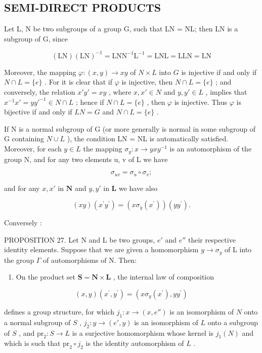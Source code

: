 \subsection{SEMI-DIRECT PRODUCTS}

Let L, N be two subgroups of a group G, such that LN = NL; then LN is a subgroup of G, since

\[
(\mathrm{LN}) (\mathrm{LN}) ^ {- 1} = \mathrm{LNN} ^ {- 1} \mathrm{L} ^ {- 1} = \mathrm{LNL} = \mathrm{LLN} = \mathrm{LN}
\]

Moreover, the mapping \(\varphi: (x, y) \to xy\) of \(N \times L\) into \(G\) is injective if and only if \(N \cap L = \{e\}\) . For it is clear that if \(\varphi\) is injective, then \(N \cap L = \{e\}\) ; and conversely, the relation \(x' y' = xy\) , where \(x, x' \in N\) and \(y, y' \in L\) , implies that \(x^{-1}x' = yy'^{-1} \in N \cap L\) ; hence if \(N \cap L = \{e\}\) , then \(\varphi\) is injective. Thus \(\varphi\) is bijective if and only if \(LN = G\) and \(N \cap L = \{e\}\) .

If N is a normal subgroup of G (or more generally is normal in some subgroup of G containing \(N \cup L\) ), the condition LN = NL is automatically satisfied. Moreover, for each \(y \in L\) the mapping \(\sigma_{y}: x \to yxy^{-1}\) is an automorphism of the group N, and for any two elements u, v of L we have

\[
\sigma_ {u v} = \sigma_ {u} \circ \sigma_ {v};\tag{1}
\]

and for any \(x, x'\) in \(\mathbf{N}\) and \(y, y'\) in \(\mathbf{L}\) we have also

\[
(x y) (x ^ {\prime} y ^ {\prime}) = (x \sigma_ {y} (x ^ {\prime})) (y y ^ {\prime}).\tag{2}
\]

Conversely :

PROPOSITION 27. Let N and L be two groups, \(e'\) and \(e''\) their respective identity elements. Suppose that we are given a homomorphism \(y \to \sigma_y\) of L into the group \(\Gamma\) of automorphisms of N. Then:

\begin{enumerate}
\def\labelenumi{\arabic{enumi})}
\tightlist
\item
  On the product set \(\mathbf{S} = \mathbf{N} \times \mathbf{L}\) , the internal law of composition
\end{enumerate}

\[
(x, y) (x ^ {\prime}, y ^ {\prime}) = (x \sigma_ {y} (x ^ {\prime}), y y ^ {\prime})\tag{3}
\]

defines a group structure, for which \(j_1: x \to (x, e'')\) is an isomorphism of \(N\) onto a normal subgroup of \(S\) , \(j_2: y \to (e', y)\) is an isomorphism of \(L\) onto a subgroup of \(S\) , and \(\mathrm{pr}_2: S \to L\) is a surjective homomorphism whose kernel is \(j_1(N)\) and which is such that \(\mathrm{pr}_2 \circ j_2\) is the identity automorphism of \(L\) .

